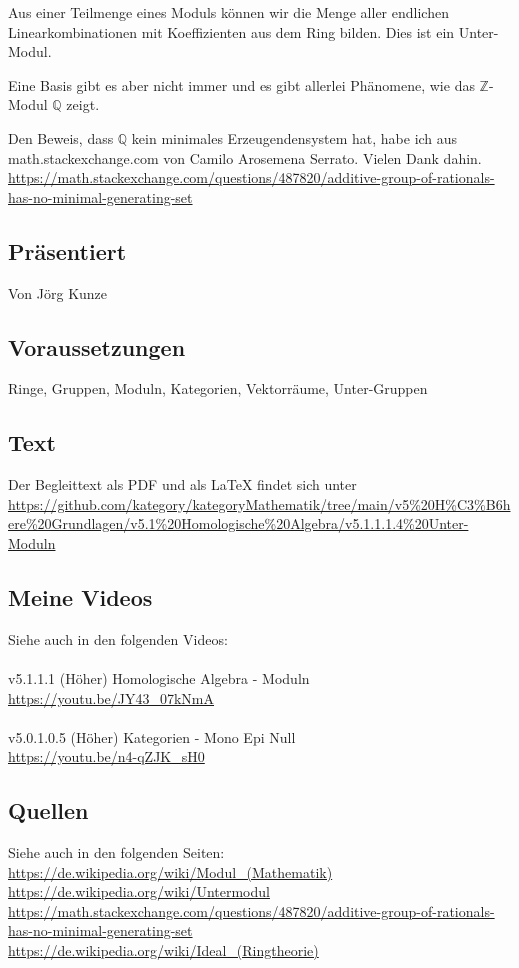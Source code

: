 \documentclass[a4paper]{amsart}
\theoremstyle{definition}
\newcommand{\Q}{\ensuremath{\mathbb{ Q }}}
\newcommand{\Z}{\ensuremath{\mathbb{ Z }}}
\begin{document}
Aus einer Teilmenge eines Moduls können wir die Menge aller endlichen Linearkombinationen mit Koeffizienten aus dem Ring bilden. Dies ist ein Unter-Modul.

Eine Basis gibt es aber nicht immer und es gibt allerlei Phänomene, wie das $\Z$-Modul $\Q$ zeigt.    

Den Beweis, dass $\Q$ kein minimales Erzeugendensystem hat, habe ich aus math.stackexchange.com von Camilo Arosemena Serrato. Vielen Dank dahin.
{\tiny
   \url{
      https://math.stackexchange.com/questions/487820/additive-group-of-rationals-has-no-minimal-generating-set
   }
}

\subsection*{Präsentiert}
Von Jörg Kunze

\subsection*{Voraussetzungen}
Ringe, Gruppen, Moduln, Kategorien, Vektorräume, Unter-Gruppen

\subsection*{Text}
Der Begleittext als PDF und als LaTeX findet sich unter
{\tiny
   \url{https://github.com/kategory/kategoryMathematik/tree/main/v5%20H%C3%B6here%20Grundlagen/v5.1%20Homologische%20Algebra/v5.1.1.1.4%20Unter-Moduln}
}

\subsection*{Meine Videos}
Siehe auch in den folgenden Videos:\\
\\
v5.1.1.1 (Höher) Homologische Algebra - Moduln\\
\url{https://youtu.be/JY43_07kNmA}\\
\\
v5.0.1.0.5 (Höher) Kategorien - Mono Epi Null\\
\url{https://youtu.be/n4-qZJK_sH0}

\subsection*{Quellen}
Siehe auch in den folgenden Seiten:\\
\url{https://de.wikipedia.org/wiki/Modul_(Mathematik)}\\
\url{https://de.wikipedia.org/wiki/Untermodul}\\
\url{https://math.stackexchange.com/questions/487820/additive-group-of-rationals-has-no-minimal-generating-set}\\
\url{https://de.wikipedia.org/wiki/Ideal_(Ringtheorie)}
\end{document}
